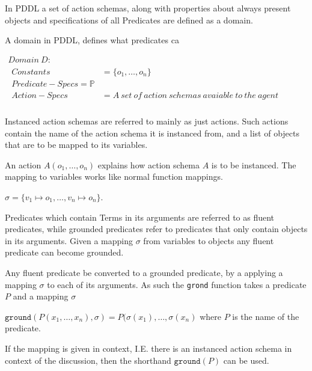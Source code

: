 \documentclass[../Master.tex]{subfiles}
\begin{document}
In PDDL a set of action schemas, along with properties about always present objects and specifications of all Predicates are defined as a domain.

\begin{definition} A domain in PDDL, defines what predicates ca
	
$
\begin{array}{ll}
Domain ~ D: & \\

\begin{array}{ll}
Constants & = \{o_1,\dots,o_n\}			 \\  
Predicate-Specs = \mathbb{P} \\
Action-Specs & = A~set~of~action~schemas~avaiable~to~the~agent \\
\end{array}
\end{array}$
\end{definition}


	

Instanced action schemas are referred to mainly as just actions. Such actions contain the name of the action schema it is instanced from, and a list of objects that are to be mapped to its variables.
\begin{definition} 
	An action $A(o_1,\dots,o_n)$ explains how action schema $A$ is to be instanced. The mapping to variables works like normal function mappings. 
	
	$\sigma = \{ v_1 \mapsto o_1,\dots,v_n \mapsto o_n \}$.
\end{definition}


Predicates which contain Terms in its arguments are referred to as fluent predicates, while grounded predicates refer to predicates that only contain objects in its arguments. Given a mapping $\sigma$ from variables to objects any fluent predicate can become grounded.
\begin{definition} 
	Any fluent predicate be converted to a grounded predicate, by a applying a mapping $\sigma$ to each of its arguments. As such the \texttt{grond} function takes a predicate $P$ and a mapping $\sigma$
	
		$\texttt{ground}(P(x_1,\dots,x_n),\sigma) = P(\sigma(x_1),\dots,\sigma(x_n)$ where $P$ is the name of the predicate.
		
	If the mapping is given in context, I.E. there is an instanced action schema in context of the discussion, then the shorthand $\texttt{ground}(P)$ can be used.
\end{definition}
\end{document}
